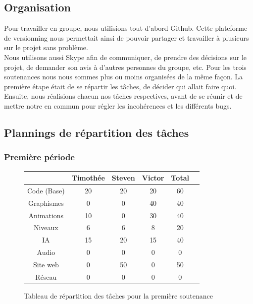 \documentclass[12pt]{article}
\begin{document}
\subsection{Organisation}

Pour travailler en groupe, nous utilisions tout d'abord Github. Cette plateforme de versionning nous permettait ainsi de pouvoir partager et travailler à plusieurs sur le projet sans problème.\\
Nous utilisons aussi Skype afin de communiquer, de prendre des décisions sur le projet, de demander son avis à d'autres personnes du groupe, etc.
Pour les trois soutenances nous nous sommes plus ou moins organisées de la même façon. La première étape était de se répartir les tâches, de décider qui allait faire quoi. Ensuite, nous réalisions chacun nos tâches respectives, avant de se réunir et de mettre notre en commun pour régler les incohérences et les différents bugs.

\subsection{Plannings de répartition des tâches}

\subsubsection{Première période}

\begin{figure}[h]
\centering

\begin{tabular}{|c|c|c|c|c|c|}
\hline
 & Timothée & Steven & Victor & Total\\
\hline
Code (Base) & 20 & 20 & 20 & 60\\
\hline
Graphismes & 0 & 0 & 40 & 40\\
\hline
Animations & 10 & 0 & 30 & 40\\
\hline
Niveaux & 6 & 6 & 8 & 20\\
\hline
IA & 15 & 20 & 15 & 40\\
\hline
Audio & 0 & 0 & 0 & 0\\
\hline
Site web & 0 & 50 & 0 & 50\\
\hline
Réseau & 0 & 0 & 0 & 0\\
\hline
\end{tabular}

\caption{Tableau de répartition des tâches pour la première soutenance}
\end{figure}
\end{document}
